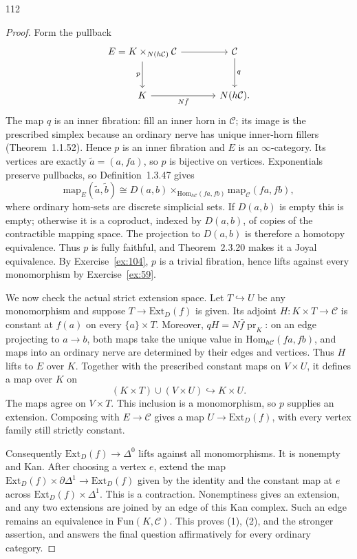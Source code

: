 \begin{exercise}{112}
\begin{proof}
Form the pullback
\[
\begin{tikzcd}[column sep=large,row sep=large]
 E=K\times_{N(h\mathcal C)}\mathcal C\arrow[r]\arrow[d,"p"']
   & \mathcal C\arrow[d,"q"] \\
 K\arrow[r,"N\bar f"'] & N(h\mathcal C).
\end{tikzcd}
\]
The map $q$ is an inner fibration: fill an inner horn in $\mathcal C$;
its image is the prescribed simplex because an ordinary nerve has
unique inner-horn fillers (Theorem~1.1.52).
Hence $p$ is an inner fibration and $E$ is an $\infty$-category.
Its vertices are exactly $\widetilde a=(a,fa)$, so $p$ is bijective on vertices.
Exponentials preserve pullbacks, so Definition~1.3.47 gives
\[
 \mathrm{map}_E(\widetilde a,\widetilde b)
 \cong D(a,b)\times_{\mathrm{Hom}_{h\mathcal C}(fa,fb)}
                         \mathrm{map}_{\mathcal C}(fa,fb),
\]
where ordinary hom-sets are discrete simplicial sets.
If $D(a,b)$ is empty this is empty; otherwise it is a coproduct,
indexed by $D(a,b)$, of copies of the contractible mapping space.
The projection to $D(a,b)$ is therefore a homotopy equivalence.
Thus $p$ is fully faithful, and Theorem~2.3.20 makes it a Joyal equivalence.
By Exercise~\ref{ex:104}, $p$ is a trivial fibration, hence lifts against
every monomorphism by Exercise~\ref{ex:59}.

We now check the actual strict extension space.
Let $T\hookrightarrow U$ be any monomorphism and suppose
$T\to\mathrm{Ext}_D(f)$ is given.
Its adjoint $H\colon K\times T\to\mathcal C$ is constant at $f(a)$ on
every $\{a\}\times T$.
Moreover, $qH=N\bar f\operatorname{pr}_K$:
on an edge projecting to $a\to b$, both maps take the unique value
in $\mathrm{Hom}_{h\mathcal C}(fa,fb)$, and maps into an ordinary nerve
are determined by their edges and vertices.
Thus $H$ lifts to $E$ over $K$.
Together with the prescribed constant maps on $V\times U$, it defines
a map over $K$ on
\[
 (K\times T)\cup(V\times U)\hookrightarrow K\times U.
\]
The maps agree on $V\times T$.
This inclusion is a monomorphism, so $p$ supplies an extension.
Composing with $E\to\mathcal C$ gives a map
$U\to\mathrm{Ext}_D(f)$, with every vertex family still strictly constant.

Consequently $\mathrm{Ext}_D(f)\to\Delta^0$ lifts against all monomorphisms.
It is nonempty and Kan. After choosing a vertex $e$, extend the map
$\mathrm{Ext}_D(f)\times\partial\Delta^1\to\mathrm{Ext}_D(f)$
given by the identity and the constant map at $e$ across
$\mathrm{Ext}_D(f)\times\Delta^1$.
This is a contraction.
Nonemptiness gives an extension, and any two extensions are joined
by an edge of this Kan complex. Such an edge remains an equivalence
in $\mathrm{Fun}(K,\mathcal C)$.
This proves (1), (2), and the stronger assertion, and answers the final
question affirmatively for every ordinary category.
\end{proof}
\end{exercise}
